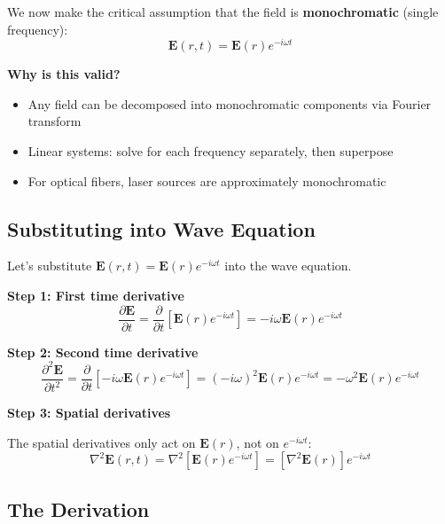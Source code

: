 \documentclass[12pt]{article}
\begin{document}
We now make the critical assumption that the field is \textbf{monochromatic} (single frequency):
\begin{equation}
\mathbf{E}(r, t) = \mathbf{E}(r) e^{-i\omega t}
\end{equation}

\textbf{Why is this valid?}
\begin{itemize}
\item Any field can be decomposed into monochromatic components via Fourier transform
\item Linear systems: solve for each frequency separately, then superpose
\item For optical fibers, laser sources are approximately monochromatic
\end{itemize}

\subsection{Substituting into Wave Equation}

Let's substitute $\mathbf{E}(r, t) = \mathbf{E}(r) e^{-i\omega t}$ into the wave equation.

\textbf{Step 1: First time derivative}
\begin{equation}
\frac{\partial \mathbf{E}}{\partial t} = \frac{\partial}{\partial t}\left[\mathbf{E}(r) e^{-i\omega t}\right] = -i\omega \mathbf{E}(r) e^{-i\omega t}
\end{equation}

\textbf{Step 2: Second time derivative}
\begin{equation}
\frac{\partial^2 \mathbf{E}}{\partial t^2} = \frac{\partial}{\partial t}\left[-i\omega \mathbf{E}(r) e^{-i\omega t}\right] = (-i\omega)^2 \mathbf{E}(r) e^{-i\omega t} = -\omega^2 \mathbf{E}(r) e^{-i\omega t}
\end{equation}

\textbf{Step 3: Spatial derivatives}

The spatial derivatives only act on $\mathbf{E}(r)$, not on $e^{-i\omega t}$:
\begin{equation}
\nabla^2 \mathbf{E}(r,t) = \nabla^2 \left[\mathbf{E}(r) e^{-i\omega t}\right] = \left[\nabla^2 \mathbf{E}(r)\right] e^{-i\omega t}
\end{equation}

\subsection{The Derivation}
\end{document}
